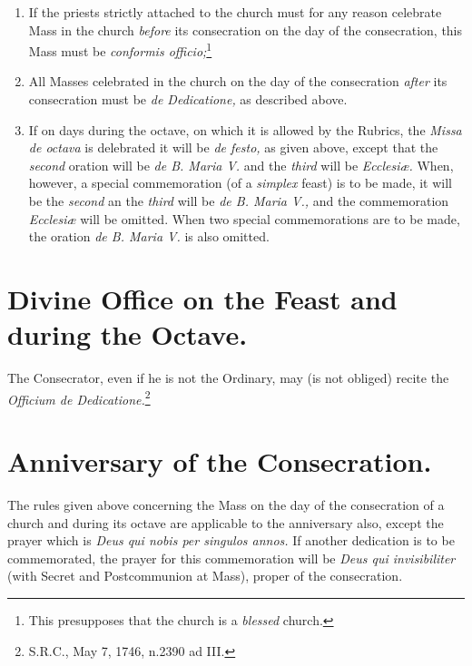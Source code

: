 \documentclass[letterpaper]{report}
\newcommand\src{\textsc{S.R.C.}}
\begin{document}
{\begin{enumerate}
        \item If the priests strictly attached to the church must for any reason
            celebrate Mass in the church \textit{before} its consecration on the
            day of the consecration, this Mass must be \textit{conformis
            officio;}\footnote{This presupposes that the church is a
            \textit{blessed} church.}

        \item All Masses celebrated in the church on the day of the consecration
            \textit{after} its consecration must be \textit{de Dedicatione,} as
            described above.

        \item If on days during the octave, on which it is allowed by the Rubrics,
            the \textit{Missa de octava} is delebrated it will be \textit{de
            festo,} as given above, except that the \textit{second} oration will be
            \textit{de B. Maria V.} and the \textit{third} will be
            \textit{Ecclesi\ae.} When, however, a special commemoration (of a
            \textit{simplex} feast) is to be made, it will be the \textit{second}
            an the \textit{third} will be \textit{de B. Maria V.,} and the
            commemoration \textit{Ecclesi\ae} will be omitted. When two special
            commemorations are to be made, the oration \textit{de B. Maria V.} is
            also omitted.

    \end{enumerate}

    \section{Divine Office on the Feast and during the Octave.}

    \rubric The Consecrator, even if he is not the Ordinary, may (is not obliged)
    recite the \textit{Officium de Dedicatione.}\footnote{\src, May 7, 1746,
    n.2390 ad III.}

    \section{Anniversary of the Consecration.}

    \rubric The rules given above concerning the Mass on the day of the
    consecration of a church and during its octave are applicable to the
    anniversary also, except the prayer which is \textit{Deus qui nobis per
    singulos annos.} If another dedication is to be commemorated, the prayer for
    this commemoration will be \textit{Deus qui invisibiliter} (with Secret and
    Postcommunion at Mass), proper of the consecration.

}


\nocite{levav:churchconsecration}
\nocite{ml:1947}
\nocite{ml:1959}
\nocite{rc:ecclesiae}
\nocite{martinucci:3}
\printbibliography
    
\end{document}
